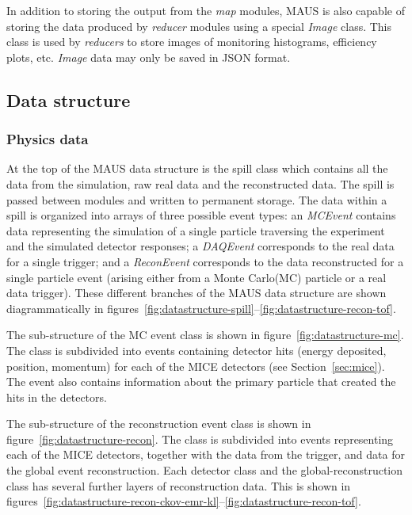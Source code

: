 \documentclass[11pt,a4paper]{article}
\begin{document}
In addition to storing the output from the \textit{map} modules, MAUS is also capable of storing the data  produced by  \textit{reducer} modules using a special \emph{Image} class. This class is used by \emph{reducers} to store images of monitoring histograms, efficiency plots, etc. \emph{Image} data may only be saved in JSON format.

\subsection{Data structure}\label{sec:maus-datastr}

\subsubsection{Physics data} \label{sec:physics-datastr}

At the top of the MAUS data structure is the spill class which contains all the data from the simulation, raw real data and the reconstructed data. The spill is passed between modules and written to permanent storage. The data within a spill is organized into arrays of three possible event types: an \emph{MCEvent} contains data  representing the simulation of a single particle traversing the experiment and the simulated detector responses; a \emph{DAQEvent} corresponds to the real data for a single trigger; and a \emph{ReconEvent} corresponds to the data reconstructed for a single particle event (arising either from a Monte Carlo(MC) particle or a real data trigger). These different branches of the MAUS data structure are shown diagrammatically in figures~\ref{fig:datastructure-spill}--\ref{fig:datastructure-recon-tof}.

The sub-structure of the MC event class is shown in figure~\ref{fig:datastructure-mc}. The class is subdivided into events containing detector hits (energy deposited, position, momentum) for each of the MICE detectors (see Section~\ref{sec:mice}). The event also contains information about the primary particle that created the hits in the detectors.

The sub-structure of the reconstruction event class is shown in figure~\ref{fig:datastructure-recon}. The class is subdivided into events representing each of the MICE detectors, together with the data from the trigger, and data for the global event reconstruction. Each detector class and the global-reconstruction class has several further layers of reconstruction data. This is shown in figures~\ref{fig:datastructure-recon-ckov-emr-kl}--\ref{fig:datastructure-recon-tof}.
\end{document}

